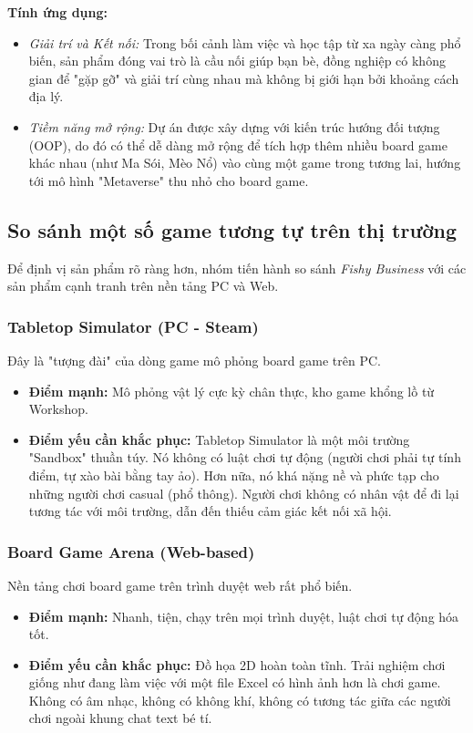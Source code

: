     \textbf{Tính ứng dụng:}
    \begin{itemize}
        \item \textit{Giải trí và Kết nối:} Trong bối cảnh làm việc và học tập từ xa ngày càng phổ biến, sản phẩm đóng vai trò là cầu nối giúp bạn bè, đồng nghiệp có không gian để "gặp gỡ" và giải trí cùng nhau mà không bị giới hạn bởi khoảng cách địa lý.
        \item \textit{Tiềm năng mở rộng:} Dự án được xây dựng với kiến trúc hướng đối tượng (OOP), do đó có thể dễ dàng mở rộng để tích hợp thêm nhiều board game khác nhau (như Ma Sói, Mèo Nổ) vào cùng một game trong tương lai, hướng tới mô hình "Metaverse" thu nhỏ cho board game.
    \end{itemize}

\subsection{So sánh một số game tương tự trên thị trường}
Để định vị sản phẩm rõ ràng hơn, nhóm tiến hành so sánh \textit{Fishy Business} với các sản phẩm cạnh tranh trên nền tảng PC và Web.

\subsubsection{Tabletop Simulator (PC - Steam)}
Đây là "tượng đài" của dòng game mô phỏng board game trên PC.
\begin{itemize}
    \item \textbf{Điểm mạnh:} Mô phỏng vật lý cực kỳ chân thực, kho game khổng lồ từ Workshop.
    \item \textbf{Điểm yếu cần khắc phục:} Tabletop Simulator là một môi trường "Sandbox" thuần túy. Nó không có luật chơi tự động (người chơi phải tự tính điểm, tự xào bài bằng tay ảo). Hơn nữa, nó khá nặng nề và phức tạp cho những người chơi casual (phổ thông). Người chơi không có nhân vật để đi lại tương tác với môi trường, dẫn đến thiếu cảm giác kết nối xã hội.
\end{itemize}

\subsubsection{Board Game Arena (Web-based)}
Nền tảng chơi board game trên trình duyệt web rất phổ biến.
\begin{itemize}
    \item \textbf{Điểm mạnh:} Nhanh, tiện, chạy trên mọi trình duyệt, luật chơi tự động hóa tốt.
    \item \textbf{Điểm yếu cần khắc phục:} Đồ họa 2D hoàn toàn tĩnh. Trải nghiệm chơi giống như đang làm việc với một file Excel có hình ảnh hơn là chơi game. Không có âm nhạc, không có không khí, không có tương tác giữa các người chơi ngoài khung chat text bé tí.
\end{itemize}

